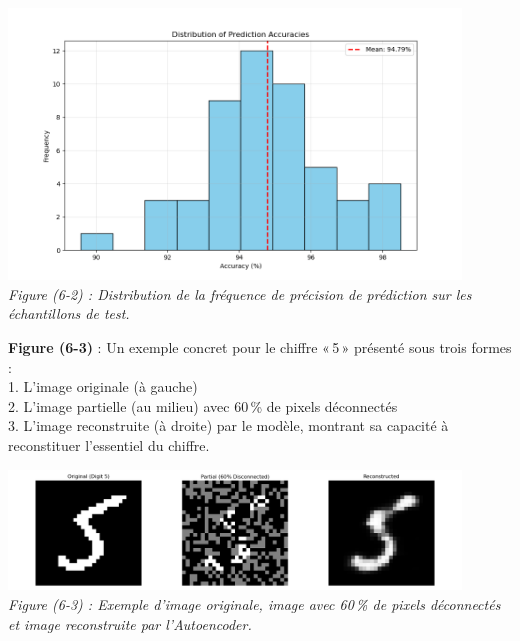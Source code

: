 \documentclass[a4paper,12pt]{article}
\begin{document}
\begin{center}

\includegraphics[width=0.9\textwidth]{accuracy_distribution.png}\\

\emph{Figure (6-2) : Distribution de la fréquence de précision de prédiction sur les échantillons de test.}
\end{center}

\noindent
\textbf{Figure (6-3)} : Un exemple concret pour le chiffre «\,5\,» présenté sous trois formes :\\
1. L’image originale (à gauche)\\
2. L’image partielle (au milieu) avec 60\,\% de pixels déconnectés\\
3. L’image reconstruite (à droite) par le modèle, montrant sa capacité à reconstituer l’essentiel du chiffre.

\begin{center}
\includegraphics[width=0.9\textwidth]{sample_8.png}\\
\emph{Figure (6-3) : Exemple d'image originale, image avec 60\,\% de pixels déconnectés et image reconstruite par l’Autoencoder.}
\end{center}
\end{document}
